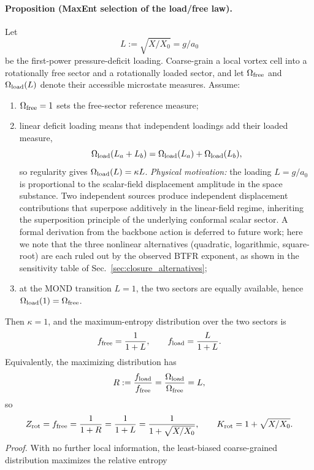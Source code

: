 \documentclass[11pt]{article}
\begin{document}
\paragraph{Proposition (MaxEnt selection of the load/free law).}
Let
\[
L:=\sqrt{X/X_0}=g/a_0
\]
be the first-power pressure-deficit loading.  Coarse-grain a local vortex
cell into a rotationally free sector and a rotationally loaded sector, and
let $\Omega_{\rm free}$ and $\Omega_{\rm load}(L)$ denote their accessible
microstate measures.  Assume:
\begin{enumerate}
\item $\Omega_{\rm free}=1$ sets the free-sector reference measure;
\item linear deficit loading means that independent loadings add their loaded
  measure,
  \[
  \Omega_{\rm load}(L_a+L_b)
  = \Omega_{\rm load}(L_a)+\Omega_{\rm load}(L_b),
  \]
  so regularity gives $\Omega_{\rm load}(L)=\kappa L$.
  \emph{Physical motivation:} the loading $L=g/a_0$ is proportional
  to the scalar-field displacement amplitude in the space substance.
  Two independent sources produce independent displacement
  contributions that superpose additively in the linear-field regime,
  inheriting the superposition principle of the underlying conformal
  scalar sector.  A formal derivation from the backbone action is
  deferred to future work; here we note that the three nonlinear
  alternatives (quadratic, logarithmic, square-root) are each
  ruled out by the observed BTFR exponent, as shown in the
  sensitivity table of Sec.~\ref{sec:closure_alternatives};
\item at the MOND transition $L=1$, the two sectors are equally available,
  hence $\Omega_{\rm load}(1)=\Omega_{\rm free}$.
\end{enumerate}
Then $\kappa=1$, and the maximum-entropy distribution over the two sectors is
\begin{equation}
f_{\rm free}
= \frac{1}{1+L},
\qquad
f_{\rm load}
= \frac{L}{1+L}.
\label{eq:zrot_maxent}
\end{equation}
Equivalently, the maximizing distribution has
\[
R:=\frac{f_{\rm load}}{f_{\rm free}}=\frac{\Omega_{\rm load}}{\Omega_{\rm free}}=L,
\]
so
\begin{equation}
Z_{\rm rot}=f_{\rm free}=\frac{1}{1+R}
=\frac{1}{1+L}
=\frac{1}{1+\sqrt{X/X_0}},
\qquad
K_{\rm rot}=1+\sqrt{X/X_0}.
\label{eq:zrot_maxent_closed}
\end{equation}
\textit{Proof.}
With no further local information, the least-biased coarse-grained
distribution maximizes the relative entropy
\end{document}
